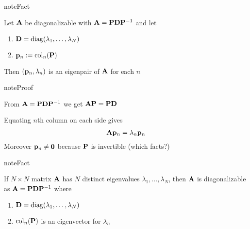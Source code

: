 \documentclass[letterpaper,10pt,english]{jupyterBook}
\begin{document}
\begin{sphinxadmonition}{note}{Fact}

\sphinxAtStartPar
Let \({\bf A}\) be diagonalizable with \({\bf A} = {\bf P} {\bf D}
{\bf P}^{-1}\) and let
\begin{enumerate}
%
\item {} 
\sphinxAtStartPar
\({\bf D} = \mathrm{diag}(\lambda_1, \ldots, \lambda_N)\)

\item {} 
\sphinxAtStartPar
\({\bf p}_n := \mathrm{col}_n({\bf P})\)

\end{enumerate}

\sphinxAtStartPar
Then \(({\bf p}_n, \lambda_n)\) is an eigenpair of \({\bf A}\) for each \(n\)
\end{sphinxadmonition}

\begin{sphinxadmonition}{note}{Proof}

\sphinxAtStartPar
From \({\bf A} = {\bf P} {\bf D} {\bf P}^{-1}\) we get \({\bf A} {\bf P} = {\bf P} {\bf D}\)

\sphinxAtStartPar
Equating \(n\)\sphinxhyphen{}th column on each side gives
\begin{equation*}
\begin{split}
%
{\bf A} {\bf p}_n = \lambda_n {\bf p}_n
%
\end{split}
\end{equation*}
\sphinxAtStartPar
Moreover \({\bf p}_n \ne {\bf 0}\) because \({\bf P}\) is invertible (which facts?)
\end{sphinxadmonition}

\begin{sphinxadmonition}{note}{Fact}

\sphinxAtStartPar
If \(N \times N\) matrix \({\bf A}\) has \(N\) distinct eigenvalues
\(\lambda_1, \ldots, \lambda_N\), then
\({\bf A}\) is diagonalizable as \({\bf A} = {\bf P} {\bf D} {\bf P}^{-1}\) where
\begin{enumerate}
%
\item {} 
\sphinxAtStartPar
\({\bf D} = \mathrm{diag}(\lambda_1, \ldots, \lambda_N)\)

\item {} 
\sphinxAtStartPar
\(\mathrm{col}_n({\bf P})\) is an eigenvector for \(\lambda_n\)

\end{enumerate}
\end{sphinxadmonition}
\end{document}
